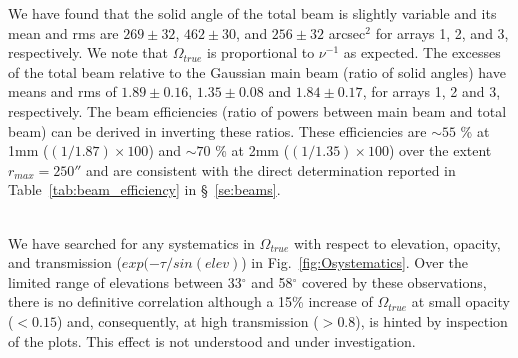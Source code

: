 We have found that the solid angle of the total beam is slightly variable and its mean and rms are
$269\pm32$, $462\pm30$, and $256\pm32$ arcsec$^2$ for arrays 1, 2, and
3, respectively. We note 
that $\Omega_{true}$ is proportional to $\nu^{-1}$ as expected. The excesses of the total beam
relative to the Gaussian main beam (ratio of solid angles) have means and rms
of $1.89\pm0.16$, $1.35\pm0.08$ and $1.84\pm0.17$, for arrays 1, 2 and 3, respectively.
The beam efficiencies (ratio of powers between main beam  and total
beam) can be derived in inverting these ratios. These efficiencies are
$\sim 55$ \% at 1mm ($(1/1.87) \times 100$) and $\sim 70$ \% at 2mm ($(1/1.35) \times 100$)
over the extent $r_{max}=250''$ and are consistent with the direct
determination reported in Table~\ref{tab:beam_efficiency} in \S~\ref{se:beams}.
 
\\ 
 
 
We have searched for any systematics in  $\Omega_{true}$ with respect to elevation,
opacity,  and transmission ($exp(-\tau/sin(elev)$) in Fig.~\ref{fig:Osystematics}.
Over the limited range of elevations between  33$^{\circ}$ and 58$^{\circ}$ covered by these observations,
there is no definitive correlation although
a 15\% increase of $\Omega_{true}$ at small opacity ($<0.15$) and, consequently,
at high transmission ($> 0.8$), is hinted by inspection of the plots.
This effect is not understood and under investigation. 

